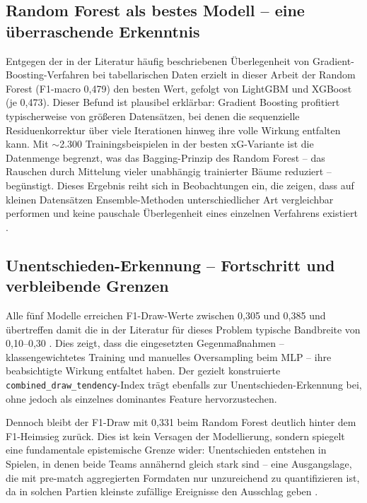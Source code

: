 \subsection{Random Forest als bestes Modell -- eine überraschende Erkenntnis}

Entgegen der in der Literatur häufig beschriebenen Überlegenheit von
Gradient-Boosting-Verfahren bei tabellarischen Daten \cite{ChenGuestrin2016,KeEtAl2017}
erzielt in dieser Arbeit der Random Forest (F1-macro 0,479) den besten
Wert, gefolgt von LightGBM und XGBoost (je 0,473). Dieser Befund ist
plausibel erklärbar: Gradient Boosting profitiert typischerweise von
größeren Datensätzen, bei denen die sequenzielle Residuenkorrektur über
viele Iterationen hinweg ihre volle Wirkung entfalten kann. Mit
$\sim$2.300 Trainingsbeispielen in der besten xG-Variante ist die
Datenmenge begrenzt, was das Bagging-Prinzip des Random Forest -- das
Rauschen durch Mittelung vieler unabhängig trainierter Bäume reduziert
-- begünstigt. Dieses Ergebnis reiht sich in Beobachtungen ein, die
zeigen, dass auf kleinen Datensätzen Ensemble-Methoden unterschiedlicher
Art vergleichbar performen und keine pauschale Überlegenheit eines
einzelnen Verfahrens existiert \cite{BunkerThabtah2019}.

\subsection{Unentschieden-Erkennung -- Fortschritt und verbleibende Grenzen}

Alle fünf Modelle erreichen F1-Draw-Werte zwischen 0,305 und 0,385 und
übertreffen damit die in der Literatur für dieses Problem typische
Bandbreite von 0,10--0,30 \cite{BunkerThabtah2019,HubacekSourekZelezny2019}.
Dies zeigt, dass die eingesetzten Gegenmaßnahmen -- klassengewichtetes
Training und manuelles Oversampling beim MLP -- ihre beabsichtigte
Wirkung entfaltet haben. Der gezielt konstruierte
\texttt{combined\_draw\_tendency}-Index trägt ebenfalls zur
Unentschieden-Erkennung bei, ohne jedoch als einzelnes dominantes
Feature hervorzustechen.

Dennoch bleibt der F1-Draw mit 0,331 beim Random Forest deutlich hinter
dem F1-Heimsieg zurück. Dies ist kein Versagen der Modellierung, sondern
spiegelt eine fundamentale epistemische Grenze wider: Unentschieden
entstehen in Spielen, in denen beide Teams annähernd gleich stark sind
-- eine Ausgangslage, die mit pre-match aggregierten Formdaten nur
unzureichend zu quantifizieren ist, da in solchen Partien kleinste
zufällige Ereignisse den Ausschlag geben \cite{DobsonGoddard2011,Sumpter2016}.

